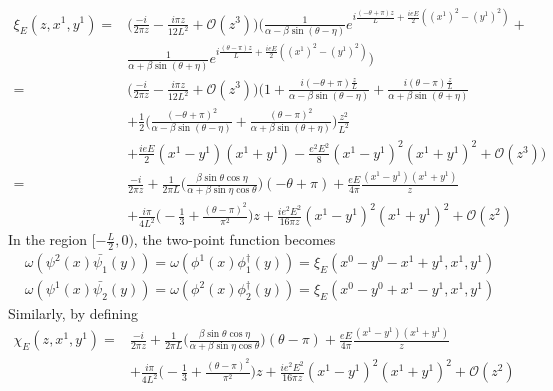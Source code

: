 \begin{equation}
\begin{split}
\xi_E(z, x^1, y^1) = & \Big( \frac{-i}{2 \pi z} - \frac{i \pi z}{12L^2} + \mathcal{O}(z^3) \Big)
\Big( \frac{1}{\alpha - \beta\sin(\theta - \eta)}e^{i\frac{(-\theta + \pi)z}{L} + \frac{ieE}{2}((x^1)^2 - (y^1)^2)} + \\
& \frac{1}{\alpha + \beta\sin(\theta + \eta)}e^{i\frac{(\theta - \pi) z}{L} + \frac{ieE}{2}((x^1)^2 - (y^1)^2)} \Big)  \\
= & \Big( \frac{-i}{2 \pi z} - \frac{i \pi z}{12L^2} + \mathcal{O}(z^3) \Big)
\Big( 1 + \frac{i(-\theta + \pi)\frac{z}{L}}{\alpha - \beta\sin(\theta - \eta)} + \frac{i(\theta - \pi)\frac{z}{L}}{\alpha + \beta\sin(\theta + \eta)}  \\
& + \frac{1}{2}\Big(\frac{(-\theta + \pi)^2}{\alpha - \beta \sin (\theta - \eta)}  
+ \frac{(\theta - \pi)^2}{\alpha + \beta \sin (\theta + \eta)} \Big)\frac{z^2}{L^2} \\
& + \frac{ieE}{2}(x^1 - y^1)(x^1 + y^1) - \frac{e^2 E^2}{8}(x^1 - y^1)^2 (x^1 + y^1)^2
+ \mathcal{O}(z^3)  \Big)  \\
= & \frac{-i}{2 \pi z} + \frac{1}{2\pi L}\Big( \frac{\beta \sin \theta \cos \eta}{\alpha + \beta \sin \eta \cos \theta}\Big) (-\theta + \pi) + \frac{eE}{4 \pi}\frac{(x^1 - y^1)(x^1 + y^1)}{z}     \\
& + \frac{i\pi}{4 L^2}\big( -\frac{1}{3} + \frac{(\theta - \pi)^2}{\pi^2}\big)z
+ \frac{i e^2 E^2}{16 \pi z} (x^1 - y^1)^2 (x^1 + y^1)^2
+ \mathcal{O}(z^2)
\end{split}
\end{equation}
In the region $[-\frac{L}{2}, 0)$, the two-point function becomes
\begin{equation*}
\begin{split}
\omega(\psi^2(x) \bar{\psi_1}(y)) = 
\omega(\phi^1(x) \phi^\dagger_1(y)) = \xi_E(x^0 - y^0 - x^1 + y^1, x^1, y^1) \\
 \omega(\psi^1(x) \bar{\psi_2}(y)) = 
\omega(\phi^2(x) \phi^\dagger_2(y)) = \xi_E(x^0 - y^0 + x^1 - y^1, x^1, y^1)
\end{split}
\end{equation*}
Similarly, by defining 
\begin{equation}
\begin{split}
\chi_E(z, x^1, y^1) = 
& \frac{-i}{2 \pi z} + \frac{1}{2\pi L}\Big( \frac{\beta \sin \theta \cos \eta}{\alpha + \beta \sin \eta \cos \theta}\Big) (\theta - \pi) + \frac{eE}{4 \pi}\frac{(x^1 - y^1)(x^1 + y^1)}{z}     \\
& + \frac{i\pi}{4 L^2}\big( -\frac{1}{3} + \frac{(\theta - \pi)^2}{\pi^2}\big)z
+ \frac{i e^2 E^2}{16 \pi z} (x^1 - y^1)^2 (x^1 + y^1)^2
+ \mathcal{O}(z^2)
\end{split}
\end{equation}

